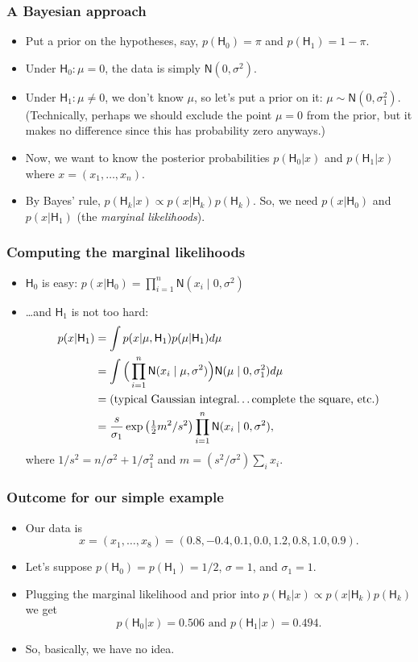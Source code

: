 \documentclass[handout]{beamer}
\def\N{\textsf{N}}
\def\H{\textsf{H}}
\begin{document}
\begin{frame}
\frametitle{A Bayesian approach}
\begin{itemize}
\item Put a prior on the hypotheses, say, $p(\H_0)=\pi$ and $p(\H_1)=1-\pi$.
\item Under $\H_0:\mu = 0$, the data is simply $\N(0,\sigma^2)$.
\item Under $\H_1:\mu\neq 0$, we don't know $\mu$, so let's put a prior on it: $\mu\sim\N(0,\sigma_1^2)$.
(Technically, perhaps we should exclude the point $\mu=0$ from the prior, but it makes no difference since this has probability zero anyways.)
\item Now, we want to know the posterior probabilities $p(\H_0|x)$ and $p(\H_1|x)$ where $x =(x_1,\dotsc,x_n)$.
\item By Bayes' rule, $p(\H_k|x)\propto p(x|\H_k)p(\H_k)$. So, we need $p(x|\H_0)$ and $p(x|\H_1)$ (the \emph{marginal likelihoods}).
\end{itemize}
\end{frame}


\begin{frame}
\frametitle{Computing the marginal likelihoods}
\begin{itemize}
\item $\H_0$ is easy: $p(x|\H_0) =\prod_{i = 1}^n \N(x_i\mid 0,\sigma^2)$
\item \dots and $\H_1$ is not too hard:
\begin{align*}
p(x|\H_1) &= \int p(x|\mu,\H_1) p(\mu|\H_1) d\mu\\
& =\int \Big(\prod_{i = 1}^n \N(x_i\mid \mu,\sigma^2)\Big) \N(\mu\mid 0,\sigma_1^2) d\mu\\
& = \mbox{(typical Gaussian integral\dots complete the square, etc.)} \\
& = \frac{s}{\sigma_1}\exp\big(\tfrac{1}{2}m^2/s^2\big) \prod_{i = 1}^n \N(x_i\mid 0,\sigma^2),
\end{align*}
where $1/s^2 = n/\sigma^2+1/\sigma_1^2$ and $m =(s^2/\sigma^2)\sum_i x_i$.
\end{itemize}
\end{frame}


\begin{frame}
\frametitle{Outcome for our simple example}
\begin{itemize}
\item Our data is
$$x = (x_1,\dotsc,x_8) = (0.8, -0.4, 0.1, 0.0, 1.2, 0.8, 1.0, 0.9).$$
\item Let's suppose $p(\H_0) = p(\H_1) = 1/2$, $\sigma = 1$, and $\sigma_1 = 1$.
\item Plugging the marginal likelihood and prior into $p(\H_k|x)\propto p(x|\H_k)p(\H_k)$ we get
$$ p(\H_0|x) = 0.506 \mbox{ and } p(\H_1|x) = 0.494.$$
\item So, basically, we have no idea.
\end{itemize}
\end{frame}
\end{document}
